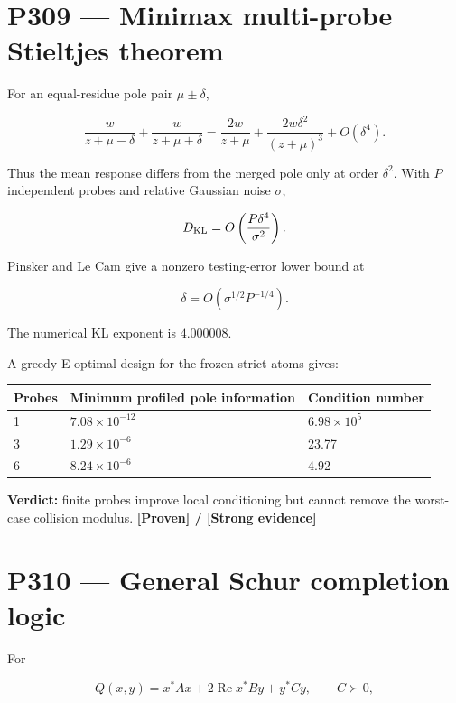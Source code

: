 \documentclass[11pt,a4paper,openany]{report}
\newcommand{\statusProven}{\textcolor{fingreen}{[Proven]}}
\newcommand{\statusStrong}{\textcolor{finblue}{[Strong evidence]}}
\begin{document}
\section{P309 --- Minimax multi-probe Stieltjes theorem}

For an equal-residue pole pair \(\mu\pm\delta\),

\[
\frac{w}{z+\mu-\delta}
+\frac{w}{z+\mu+\delta}
=
\frac{2w}{z+\mu}
+\frac{2w\delta^2}{(z+\mu)^3}
+O(\delta^4).
\]

Thus the mean response differs from the merged pole only at order \(\delta^2\). With \(P\) independent probes and relative Gaussian noise \(\sigma\),

\[
D_{\rm KL}
=
O\left(
\frac{P\delta^4}{\sigma^2}
\right).
\]

Pinsker and Le Cam give a nonzero testing-error lower bound at

\[
\delta=O(\sigma^{1/2}P^{-1/4}).
\]

The numerical KL exponent is \(4.000008\).

A greedy E-optimal design for the frozen strict atoms gives:

\begin{center}
\begingroup\small
\setlength{\tabcolsep}{2.5pt}
\renewcommand{\arraystretch}{1.16}
\begin{longtable}{@{}p{}p{}p{}@{}}
\toprule
\textbf{Probes} & \textbf{Minimum profiled pole information} & \textbf{Condition number} \\
\midrule
\endhead
1 & \(7.08\times10^{-12}\) & \(6.98\times10^5\) \\
3 & \(1.29\times10^{-6}\) & 23.77 \\
6 & \(8.24\times10^{-6}\) & 4.92 \\
\bottomrule
\end{longtable}
\endgroup
\end{center}

\textbf{Verdict:} finite probes improve local conditioning but cannot remove the worst-case collision modulus. \textbf{\statusProven{} /\allowbreak{} \statusStrong{}}

\section{P310 --- General Schur completion logic}

For

\[
Q(x,y)
=
x^\ast A x
+2\operatorname{Re}x^\ast By
+y^\ast Cy,
\qquad C\succ0,
\]
\end{document}
